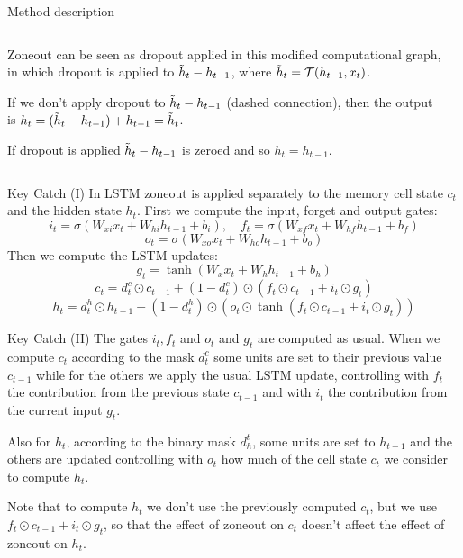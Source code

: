 \documentclass{beamer}
\begin{document}
\begin{frame}{Method description}


\begin{columns}[t]
    \begin{column}{.6\textwidth}
    Zoneout can be seen as dropout applied in this modified computational graph, in which dropout is applied to $\Tilde{h}_t - h_{t-1}$, where $\Tilde{h}_t = \mathcal{T}(h_{t-1}, x_t)$.
    
    \vspace{0.3cm}
    If we don't apply dropout to $\Tilde{h}_t - h_{t-1}$ (dashed connection), then the output is $h_t = (\Tilde{h}_t - h_{t-1}) + h_{t-1} = \Tilde{h}_t$.

    \vspace{0.3cm}
    If dropout is applied $\Tilde{h}_t - h_{t-1}$ is zeroed and so $h_t = h_{t-1}$.
    \end{column}
    \begin{column}{.3\textwidth}
        \vspace{0.2cm}
    \end{column}
  \end{columns}
\end{frame}


\begin{frame}{Key Catch (I)}
In LSTM zoneout is applied separately to the memory cell state $c_t$ and the hidden state $h_t$. First we compute the input, forget and output gates:
\[ i_t = \sigma (W_{xi}x_t +  W_{hi}h_{t-1} + b_i), \quad f_t = \sigma (W_{xf}x_t +  W_{hf}h_{t-1} + b_f) \]
\[ o_t = \sigma (W_{xo}x_t +  W_{ho}h_{t-1} + b_o) \]
Then we compute the LSTM updates:
\[ g_t = \tanh(W_{x}x_t + W_{h}h_{t-1} + b_h) \]
\[ c_t = d_t^c \odot c_{t-1} + (1-d_t^c) \odot (f_t \odot c_{t-1} + i_t \odot g_t)\]
\[ h_t = d_t^h \odot h_{t-1} + (1-d_t^h)\odot (o_t\odot \tanh(f_t \odot c_{t-1} + i_t \odot g_t)) \]
\end{frame}

\begin{frame}{Key Catch (II)}
The gates $i_t, f_t$ and $o_t$ and $g_t$ are computed as usual. When we compute $c_t$ according to the mask $d_t^c$ some units are set to their previous value $c_{t-1}$ while for the others we apply the usual LSTM update, controlling with $f_t$ the contribution from the previous state $c_{t-1}$ and with $i_t$ the contribution from the current input $g_t$. 

\vspace{0.3cm}
Also for $h_t$, according to the binary mask $d_h^t$, some units are set to $h_{t-1}$ and the others are updated controlling with $o_{t}$ how much of the cell state $c_t$ we consider to compute $h_t$.

\vspace{0.3cm}
Note that to compute $h_t$ we don't use the previously computed $c_t$, but we use $f_t \odot c_{t-1} + i_t \odot g_t$, so that the effect of zoneout on $c_t$ doesn't affect the effect of zoneout on $h_t$.
\end{frame}
\end{document}
